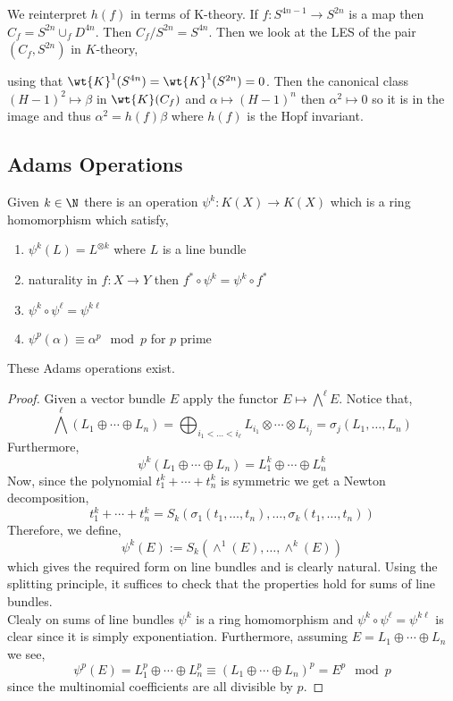 \documentclass[12pt]{extarticle}
\begin{document}
We reinterpret $h(f)$ in terms of K-theory. If $f : S^{4n - 1} \to S^{2n}$ is a map then $C_f = S^{2n} \cup_f D^{4n}$. Then $C_f / S^{2n} = S^{4n}$. Then we look at the LES of the pair $(C_f, S^{2n})$ in $K$-theory,
\begin{center}
\end{center}
using that $\wt{K}^1(S^{4n}) = \wt{K}^1(S^{2n}) = 0$. Then the canonical class $(H - 1)^2 \mapsto \beta$ in $\wt{K}(C_f)$ and $\alpha \mapsto (H - 1)^n$ then $\alpha^2 \mapsto 0$ so it is in the image and thus $\alpha^2 = h(f) \beta$ where $h(f)$ is the Hopf invariant.

\subsection{Adams Operations}

Given $k \in \N$ there is an operation $\psi^k : K(X) \to K(X)$ which is a ring homomorphism which satisfy,
\begin{enumerate}
\item $\psi^k(L) = L^{\otimes k}$ where $L$ is a line bundle
\item naturality in $f : X \to Y$ then $f^* \circ \psi^k = \psi^k \circ f^*$ 
\item $\psi^k \circ \psi^\ell = \psi^{k \ell}$
\item $\psi^p(\alpha) \equiv \alpha^p \mod{p}$ for $p$ prime
\end{enumerate}

\begin{theorem}
These Adams operations exist.
\end{theorem}

\begin{proof}
Given a vector bundle $E$ apply the functor $E \mapsto \bigwedge^\ell E$. Notice that,
\[ \bigwedge^\ell (L_1 \oplus \cdots \oplus L_n) = \bigoplus_{i_1 < \dots < i_\ell} L_{i_1} \otimes \cdots \otimes L_{i_j} = \sigma_j(L_1, \dots, L_n) \]
Furthermore, 
\[ \psi^k(L_1 \oplus \cdots \oplus L_n) = L_1^k \oplus \cdots \oplus L^k_n \]
Now, since the polynomial $t_1^k + \cdots + t_n^k$ is symmetric we get a Newton decomposition,
\[ t_1^k + \cdots + t^k_n = S_k(\sigma_1(t_1, \dots, t_n), \dots, \sigma_k(t_1, \dots, t_n)) \]
Therefore, we define,
\[ \psi^k(E) := S_k(\wedge^1(E), \dots, \wedge^k(E)) \]
which gives the required form on line bundles and is clearly natural. Using the splitting principle, it suffices to check that the properties hold for sums of line bundles. 
\bigskip\\
Clealy on sums of line bundles $\psi^k$ is a ring homomorphism and $\psi^k \circ \psi^\ell = \psi^{k \ell}$ is clear since it is simply exponentiation. Furthermore, assuming $E = L_1 \oplus \cdots \oplus L_n$ we see,
\[ \psi^p(E) = L_1^p \oplus \cdots \oplus L_n^p \equiv (L_1 \oplus \cdots \oplus L_n)^p = E^p \mod{p} \]
since the multinomial coefficients are all divisible by $p$. 
\end{proof}
\end{document}
